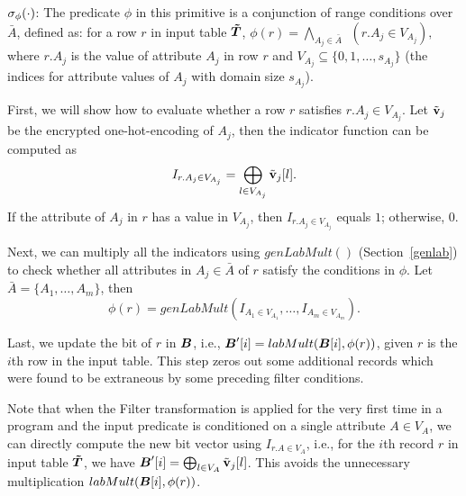  $\sigma_{\phi}(\cdot)$: The predicate $\phi$ in this primitive is a conjunction of range conditions over $\bar{A}$, defined as: for a row $r$ in input table $\boldsymbol{\tilde{T}}$,
$\phi(r) = \bigwedge_{A_j\in \bar{A}} ~~(r.{A_j} \in V_{A_j}),$ where $r.A_j$ is the value of attribute $A_j$ in row $r$ and $V_{A_j} \subseteq \{0,1,\ldots,s_{A_j}\}$ (the indices for attribute values of $A_{j}$ with domain size $s_{A_j}$).

First, we will show how to evaluate whether a row $r$ satisfies $r.{A_j} \in V_{A_j}$. Let $\tilde{\bf{v}}_j$ be the encrypted one-hot-encoding of $A_j$, then the indicator function can be computed as
$$I_{r.{A_j}\in V_{A_j}}=\bigoplus_{l\in V_{A_j}}\tilde{\bf{v}}_j[l].$$
If the attribute of $A_j$ in $r$ has a value in $V_{A_j}$, then $I_{r.{A_j}\in V_{A_j}}$ equals $1$; otherwise, $0$.

Next, we can multiply all the indicators using $genLabMult()$ (Section~\ref{genlab}) to check whether all attributes in $A_j\in \bar{A}$ of $r$ satisfy the conditions in $\phi$. Let $\bar{A} = \{A_1,\ldots,A_m\}$, then $$\phi(r) = genLabMult(I_{A_1\in V_{A_1}},\ldots, I_{A_m\in V_{A_m}}).$$

Last, we update the bit of $r$ in $\boldsymbol{B}$, i.e., $\boldsymbol{B}'[i] = labMult(\boldsymbol{B}[i], \phi(r))$, given $r$ is the $i$th row in the input table. This step zeros out some additional records which were found to be extraneous by some preceding filter conditions.

Note that when the \textsf{Filter} transformation is applied for the very first time in a \system program and the input predicate is conditioned on a single attribute $A \in V_A$, we can directly compute the new bit vector using $I_{r.A\in V_{A}}$, i.e., for the $i$th record $r$ in input table $\boldsymbol{\tilde{T}}$, we have $\boldsymbol{B}'[i] =\bigoplus_{l\in V_A} \tilde{\bf{v}}_j[l]$.  This avoids the unnecessary multiplication $labMult(\boldsymbol{B}[i],\phi(r))$.


